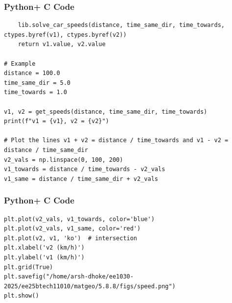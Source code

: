 \documentclass{beamer}
\begin{document}
\begin{frame}[fragile]
    \frametitle{Python+ C Code}
\begin{lstlisting}
    lib.solve_car_speeds(distance, time_same_dir, time_towards, ctypes.byref(v1), ctypes.byref(v2))
    return v1.value, v2.value

# Example
distance = 100.0
time_same_dir = 5.0
time_towards = 1.0

v1, v2 = get_speeds(distance, time_same_dir, time_towards)
print(f"v1 = {v1}, v2 = {v2}")

# Plot the lines v1 + v2 = distance / time_towards and v1 - v2 = distance / time_same_dir
v2_vals = np.linspace(0, 100, 200)
v1_towards = distance / time_towards - v2_vals
v1_same = distance / time_same_dir + v2_vals
\end{lstlisting}
\end{frame}

\begin{frame}[fragile]
    \frametitle{Python+ C Code}
\begin{lstlisting}
plt.plot(v2_vals, v1_towards, color='blue')
plt.plot(v2_vals, v1_same, color='red')
plt.plot(v2, v1, 'ko')  # intersection
plt.xlabel('v2 (km/h)')
plt.ylabel('v1 (km/h)')
plt.grid(True)
plt.savefig("/home/arsh-dhoke/ee1030-2025/ee25btech11010/matgeo/5.8.8/figs/speed.png")
plt.show()

\end{lstlisting}
\end{frame}
\end{document}
